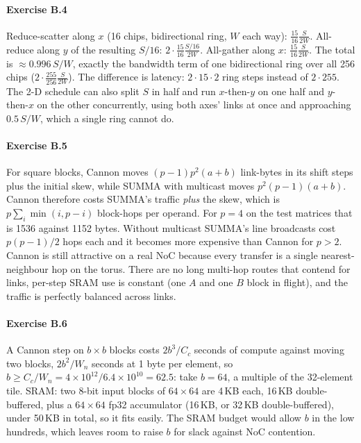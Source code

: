 \paragraph{Exercise B.4}
Reduce-scatter along $x$ (16 chips, bidirectional ring, $W$ each way): $\frac{15}{16}\frac{S}{2W}$.
All-reduce along $y$ of the resulting $S/16$: $2\cdot\frac{15}{16}\frac{S/16}{2W}$. All-gather along
$x$: $\frac{15}{16}\frac{S}{2W}$. The total is $\approx0.996\,S/W$, exactly the bandwidth term of one
bidirectional ring over all 256 chips ($2\cdot\frac{255}{256}\frac{S}{2W}$). The difference is latency:
$2\cdot15\cdot2$ ring steps instead of $2\cdot255$. The 2-D schedule can also split $S$ in half and run
$x$-then-$y$ on one half and $y$-then-$x$ on the other concurrently, using both axes' links at once and
approaching $0.5\,S/W$, which a single ring cannot do.

\paragraph{Exercise B.5}
For square blocks, Cannon moves $(p-1)p^2(a+b)$ link-bytes in its shift steps plus the initial skew,
while SUMMA with multicast moves $p^2(p-1)(a+b)$. Cannon therefore costs SUMMA's traffic \emph{plus} the
skew, which is $p\sum_i\min(i,p-i)$ block-hops per operand. For $p=4$ on the test matrices that is 1536
against 1152 bytes. Without multicast SUMMA's line broadcasts cost $p(p-1)/2$ hops each and it becomes
more expensive than Cannon for $p>2$. Cannon is still attractive on a real NoC because every
transfer is a single nearest-neighbour hop on the torus. There are no long multi-hop routes that
contend for links, per-step SRAM use is constant (one $A$ and one $B$ block in flight), and the
traffic is perfectly balanced across links.

\paragraph{Exercise B.6}
A Cannon step on $b\times b$ blocks costs $2b^3/C_c$ seconds of compute against moving two blocks,
$2b^2/W_n$ seconds at 1 byte per element, so $b \ge C_c/W_n = 4\times10^{12}/6.4\times10^{10} = 62.5$:
take $b=64$, a multiple of the 32-element tile. SRAM: two 8-bit input blocks of $64\times64$ are 4\,KB
each, 16\,KB double-buffered, plus a $64\times64$ fp32 accumulator (16\,KB, or 32\,KB
double-buffered), under 50\,KB in total, so it fits easily. The SRAM budget would allow $b$ in the
low hundreds, which leaves room to raise $b$ for slack against NoC contention.

